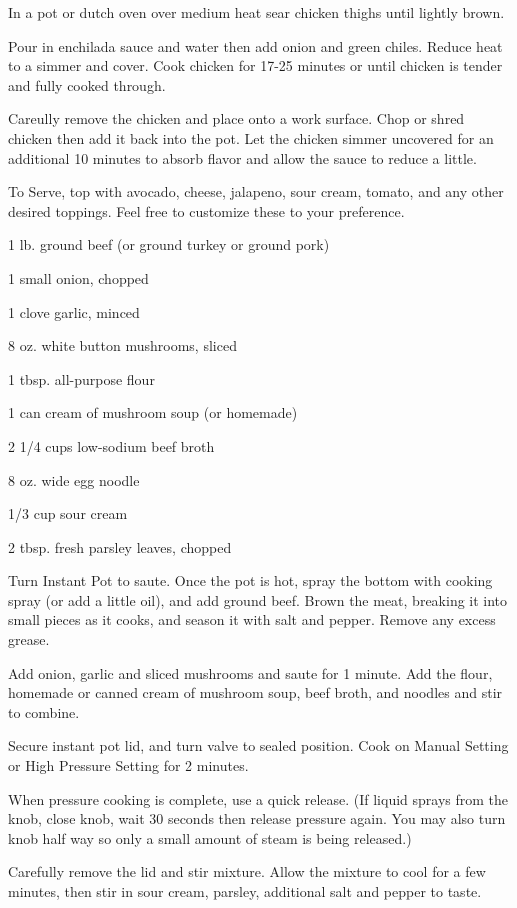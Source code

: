 \documentclass{cookbook}
\begin{document}
In a pot or dutch oven over medium heat sear chicken thighs until lightly brown.

Pour in enchilada sauce and water then add onion and green chiles. Reduce heat to a simmer and cover. Cook chicken for 17-25 minutes or until chicken is tender and fully cooked through.

Careully remove the chicken and place onto a work surface. Chop or shred chicken then add it back into the pot. Let the chicken simmer uncovered for an additional 10 minutes to absorb flavor and allow the sauce to reduce a little.

To Serve, top with avocado, cheese, jalapeno, sour cream, tomato, and any other desired toppings. Feel free to customize these to your preference.


\begin{ingredients}
    \item 1 lb. ground beef (or ground turkey or ground pork)
    \item 1 small onion, chopped
    \item 1 clove garlic, minced
    \item 8 oz. white button mushrooms, sliced
    \item 1 tbsp. all-purpose flour
    \item 1 can cream of mushroom soup (or homemade)
    \item 2 1/4 cups low-sodium beef broth
    \item 8 oz. wide egg noodle
    \item 1/3 cup sour cream
    \item 2 tbsp. fresh parsley leaves, chopped
\end{ingredients}

Turn Instant Pot to saute. Once the pot is hot, spray the bottom with cooking spray (or add a little oil), and add ground beef. Brown the meat, breaking it into small pieces as it cooks, and season it with salt and pepper. Remove any excess grease.

Add onion, garlic and sliced mushrooms and saute for 1 minute. Add the flour, homemade or canned cream of mushroom soup, beef broth, and noodles and stir to combine.

Secure instant pot lid, and turn valve to sealed position. Cook on Manual Setting or High Pressure Setting for 2 minutes.

When pressure cooking is complete, use a quick release. (If liquid sprays from the knob, close knob, wait 30 seconds then release pressure again. You may also turn knob half way so only a small amount of steam is being released.)

Carefully remove the lid and stir mixture. Allow the mixture to cool for a few minutes, then stir in sour cream, parsley, additional salt and pepper to taste.
\end{document}
